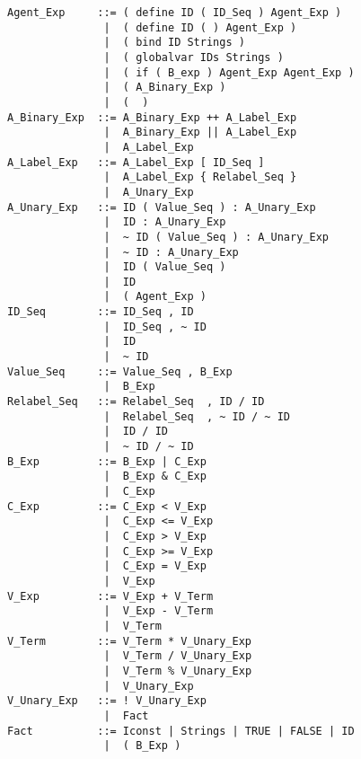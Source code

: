 \onecolumn
\footnotesize
  \begin{verbatim}
Agent_Exp     ::= ( define ID ( ID_Seq ) Agent_Exp )
               |  ( define ID ( ) Agent_Exp )
               |  ( bind ID Strings )
               |  ( globalvar IDs Strings )
               |  ( if ( B_exp ) Agent_Exp Agent_Exp )
               |  ( A_Binary_Exp )
               |  (  )
A_Binary_Exp  ::= A_Binary_Exp ++ A_Label_Exp
               |  A_Binary_Exp || A_Label_Exp
               |  A_Label_Exp
A_Label_Exp   ::= A_Label_Exp [ ID_Seq ]
               |  A_Label_Exp { Relabel_Seq }
               |  A_Unary_Exp
A_Unary_Exp   ::= ID ( Value_Seq ) : A_Unary_Exp
               |  ID : A_Unary_Exp
               |  ~ ID ( Value_Seq ) : A_Unary_Exp
               |  ~ ID : A_Unary_Exp
               |  ID ( Value_Seq )
               |  ID
               |  ( Agent_Exp )
ID_Seq        ::= ID_Seq , ID
               |  ID_Seq , ~ ID
               |  ID
               |  ~ ID
Value_Seq     ::= Value_Seq , B_Exp
               |  B_Exp
Relabel_Seq   ::= Relabel_Seq  , ID / ID
               |  Relabel_Seq  , ~ ID / ~ ID
               |  ID / ID
               |  ~ ID / ~ ID
B_Exp         ::= B_Exp | C_Exp
               |  B_Exp & C_Exp
               |  C_Exp
C_Exp         ::= C_Exp < V_Exp
               |  C_Exp <= V_Exp
               |  C_Exp > V_Exp
               |  C_Exp >= V_Exp
               |  C_Exp = V_Exp
               |  V_Exp
V_Exp         ::= V_Exp + V_Term
               |  V_Exp - V_Term
               |  V_Term
V_Term        ::= V_Term * V_Unary_Exp
               |  V_Term / V_Unary_Exp
               |  V_Term % V_Unary_Exp
               |  V_Unary_Exp
V_Unary_Exp   ::= ! V_Unary_Exp
               |  Fact
Fact          ::= Iconst | Strings | TRUE | FALSE | ID
               |  ( B_Exp )
  \end{verbatim}
